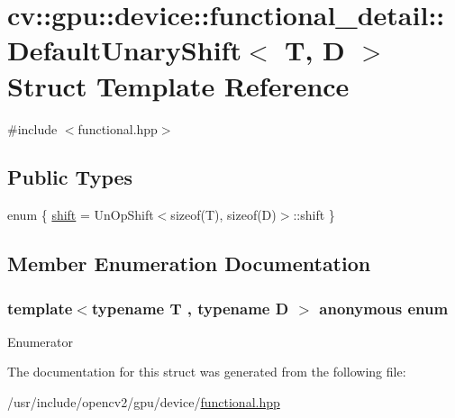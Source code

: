 \hypertarget{structcv_1_1gpu_1_1device_1_1functional__detail_1_1DefaultUnaryShift}{\section{cv\-:\-:gpu\-:\-:device\-:\-:functional\-\_\-detail\-:\-:Default\-Unary\-Shift$<$ T, D $>$ Struct Template Reference}
\label{structcv_1_1gpu_1_1device_1_1functional__detail_1_1DefaultUnaryShift}
}


{\ttfamily \#include $<$functional.\-hpp$>$}

\subsection*{Public Types}
\begin{DoxyCompactItemize}
\item 
enum \{ \hyperlink{structcv_1_1gpu_1_1device_1_1functional__detail_1_1DefaultUnaryShift_aa01fbe6b651b20e708c539c6ad6a51bfa6bf2be2aa75e599f63fe7627e8400479}{shift} = Un\-Op\-Shift$<$sizeof(T), sizeof(D)$>$\-:\-:shift
 \}
\end{DoxyCompactItemize}


\subsection{Member Enumeration Documentation}
\hypertarget{structcv_1_1gpu_1_1device_1_1functional__detail_1_1DefaultUnaryShift_aa01fbe6b651b20e708c539c6ad6a51bf}{\subsubsection[{anonymous enum}]{\setlength{\rightskip}{0pt plus 5cm}template$<$typename T , typename D $>$ anonymous enum}}\label{structcv_1_1gpu_1_1device_1_1functional__detail_1_1DefaultUnaryShift_aa01fbe6b651b20e708c539c6ad6a51bf}
\begin{Desc}
\item[Enumerator]\par
\begin{description}
\item[{\em 
\hypertarget{structcv_1_1gpu_1_1device_1_1functional__detail_1_1DefaultUnaryShift_aa01fbe6b651b20e708c539c6ad6a51bfa6bf2be2aa75e599f63fe7627e8400479}{shift}\label{structcv_1_1gpu_1_1device_1_1functional__detail_1_1DefaultUnaryShift_aa01fbe6b651b20e708c539c6ad6a51bfa6bf2be2aa75e599f63fe7627e8400479}
}]\end{description}
\end{Desc}


The documentation for this struct was generated from the following file\-:\begin{DoxyCompactItemize}
\item 
/usr/include/opencv2/gpu/device/\hyperlink{functional_8hpp}{functional.\-hpp}\end{DoxyCompactItemize}

